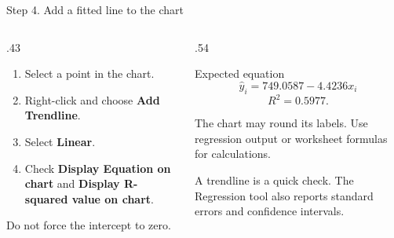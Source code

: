 \documentclass[notes,10pt,aspectratio=169]{beamer}
\begin{document}
\begin{frame}{Step 4. Add a fitted line to the chart}
\begin{columns}[T]
\begin{column}{.43\textwidth}
\begin{enumerate}
\setlength{\itemsep}{8pt}
\item Select a point in the chart.
\item Right-click and choose \textbf{Add Trendline}.
\item Select \textbf{Linear}.
\item Check \textbf{Display Equation on chart} and \textbf{Display R-squared value on chart}.
\end{enumerate}
\vspace{6pt}
Do not force the intercept to zero.
\end{column}
\begin{column}{.54\textwidth}
\begin{block}{Expected equation}
\[
\hat y_i=749.0587-4.4236x_i
\]
\[
R^2=0.5977.
\]
\end{block}
The chart may round its labels. Use regression output or worksheet formulas for calculations.
\vspace{8pt}

A trendline is a quick check. The Regression tool also reports standard errors and confidence intervals.
\end{column}
\end{columns}
\end{frame}
\end{document}
